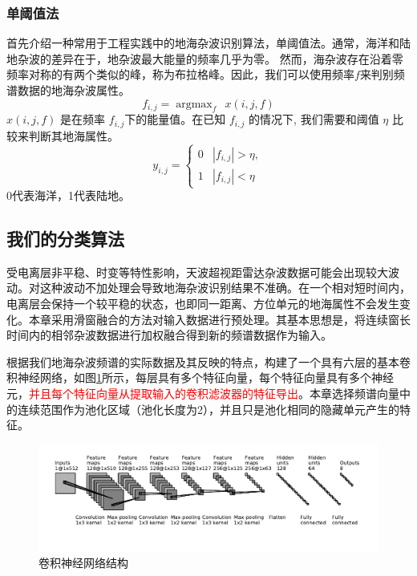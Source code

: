 \subsubsection{单阈值法}
首先介绍一种常用于工程实践中的地海杂波识别算法，单阈值法。通常，海洋和陆地杂波的差异在于，地杂波最大能量的频率几乎为零。 然而，海杂波存在沿着零频率对称的有两个类似的峰，称为布拉格峰。因此，我们可以使用频率$ f $来判别频谱数据的地海杂波属性。
\begin{equation}
f_{i, j}= \mathop{\arg\max}_{f} \ \ x(i, j, f)
\end{equation}
$x(i, j, f)$ 是在频率 $f_{i, j}$下的能量值。在已知 $f_{i, j}$ 的情况下, 我们需要和阈值 $\eta$ 比较来判断其地海属性。
\begin{equation}
	y_{i, j}= \left\{\begin{array}{ll}
		0&|f_{i, j}| > \eta, \\
		1&|f_{i, j}| < \eta
		\end{array}
		\right.
\end{equation}
0代表海洋，1代表陆地。
\subsection{我们的分类算法}
受电离层非平稳、时变等特性影响，天波超视距雷达杂波数据可能会出现较大波动。对这种波动不加处理会导致地海杂波识别结果不准确。在一个相对短时间内，电离层会保持一个较平稳的状态，也即同一距离、方位单元的地海属性不会发生变化。本章采用滑窗融合的方法对输入数据进行预处理。其基本思想是，将连续窗长时间内的相邻杂波数据进行加权融合得到新的频谱数据作为输入。

根据我们地海杂波频谱的实际数据及其反映的特点，构建了一个具有六层的基本卷积神经网络，如图\ref{fig:struct}所示，每层具有多个特征向量，每个特征向量具有多个神经元，\textcolor{red}{并且每个特征向量从提取输入的卷积滤波器的特征导出}。本章选择频谱向量中的连续范围作为池化区域（池化长度为2），并且只是池化相同的隐藏单元产生的特征。
\begin{figure}[!t]
	\centering
	\includegraphics[width=\textwidth]{figures/struct}
	\caption{卷积神经网络结构}
	\label{fig:struct}
\end{figure}

